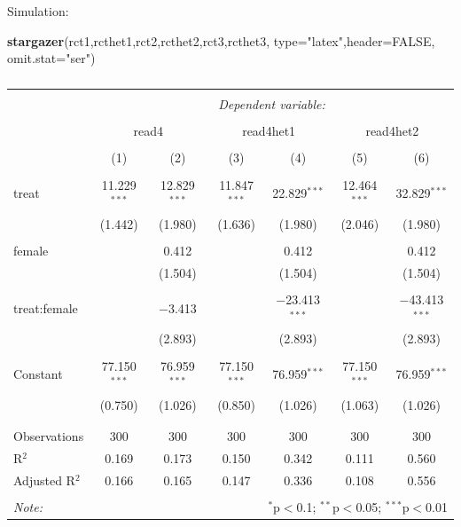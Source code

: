 \documentclass[
  ignorenonframetext,
]{beamer}
\newenvironment{Shaded}{\begin{snugshade}}{\end{snugshade}}
\newcommand{\DataTypeTok}[1]{\textcolor[rgb]{0.13,0.29,0.53}{#1}}
\newcommand{\KeywordTok}[1]{\textcolor[rgb]{0.13,0.29,0.53}{\textbf{#1}}}
\newcommand{\NormalTok}[1]{#1}
\newcommand{\OtherTok}[1]{\textcolor[rgb]{0.56,0.35,0.01}{#1}}
\newcommand{\StringTok}[1]{\textcolor[rgb]{0.31,0.60,0.02}{#1}}
\begin{document}
\begin{frame}[fragile]{Simulation:}
\protect\hypertarget{simulation-2}{}
\tiny

\begin{Shaded}
\begin{Highlighting}[]
\KeywordTok{stargazer}\NormalTok{(rct1,rcthet1,rct2,rcthet2,rct3,rcthet3, }\DataTypeTok{type=}\StringTok{"latex"}\NormalTok{,}\DataTypeTok{header=}\OtherTok{FALSE}\NormalTok{, }\DataTypeTok{omit.stat=}\StringTok{"ser"}\NormalTok{)}
\end{Highlighting}
\end{Shaded}

\begin{table}[!htbp] \centering 
  \caption{} 
  \label{} 
\begin{tabular}{@{\extracolsep{5pt}}lcccccc} 
\\[-1.8ex]\hline 
\hline \\[-1.8ex] 
 & \multicolumn{6}{c}{\textit{Dependent variable:}} \\ 
\cline{2-7} 
\\[-1.8ex] & \multicolumn{2}{c}{read4} & \multicolumn{2}{c}{read4het1} & \multicolumn{2}{c}{read4het2} \\ 
\\[-1.8ex] & (1) & (2) & (3) & (4) & (5) & (6)\\ 
\hline \\[-1.8ex] 
 treat & 11.229$^{***}$ & 12.829$^{***}$ & 11.847$^{***}$ & 22.829$^{***}$ & 12.464$^{***}$ & 32.829$^{***}$ \\ 
  & (1.442) & (1.980) & (1.636) & (1.980) & (2.046) & (1.980) \\ 
  & & & & & & \\ 
 female &  & 0.412 &  & 0.412 &  & 0.412 \\ 
  &  & (1.504) &  & (1.504) &  & (1.504) \\ 
  & & & & & & \\ 
 treat:female &  & $-$3.413 &  & $-$23.413$^{***}$ &  & $-$43.413$^{***}$ \\ 
  &  & (2.893) &  & (2.893) &  & (2.893) \\ 
  & & & & & & \\ 
 Constant & 77.150$^{***}$ & 76.959$^{***}$ & 77.150$^{***}$ & 76.959$^{***}$ & 77.150$^{***}$ & 76.959$^{***}$ \\ 
  & (0.750) & (1.026) & (0.850) & (1.026) & (1.063) & (1.026) \\ 
  & & & & & & \\ 
\hline \\[-1.8ex] 
Observations & 300 & 300 & 300 & 300 & 300 & 300 \\ 
R$^{2}$ & 0.169 & 0.173 & 0.150 & 0.342 & 0.111 & 0.560 \\ 
Adjusted R$^{2}$ & 0.166 & 0.165 & 0.147 & 0.336 & 0.108 & 0.556 \\ 
\hline 
\hline \\[-1.8ex] 
\textit{Note:}  & \multicolumn{6}{r}{$^{*}$p$<$0.1; $^{**}$p$<$0.05; $^{***}$p$<$0.01} \\ 
\end{tabular} 
\end{table}
\end{frame}
\end{document}
